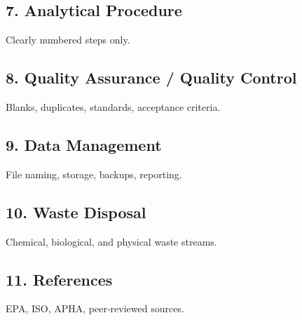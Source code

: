 \documentclass[
]{lab-sop}
\begin{document}
\subsection{7. Analytical Procedure}\label{analytical-procedure}

Clearly numbered steps only.

\subsection{8. Quality Assurance / Quality
Control}\label{quality-assurance-quality-control}

Blanks, duplicates, standards, acceptance criteria.

\subsection{9. Data Management}\label{data-management}

File naming, storage, backups, reporting.

\subsection{10. Waste Disposal}\label{waste-disposal}

Chemical, biological, and physical waste streams.

\subsection{11. References}\label{references}

EPA, ISO, APHA, peer‑reviewed sources.

\RevisionTable

\SignatureTable
\end{document}
